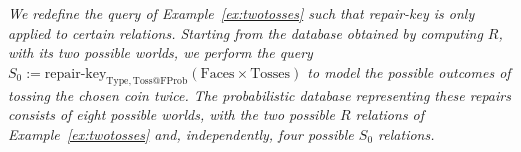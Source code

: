 \begin{example}\em
\label{ex:2}
%
We redefine the query of Example~\ref{ex:twotosses} such that
repair-key is only applied to certain relations.
Starting from the database obtained by computing $R$, with its two possible worlds, we perform the query
$
S_0 := \mbox{repair-key}_{\mathrm{Type,Toss@FProb}}
      (\mathrm{Faces} \times \mathrm{Tosses})
$
to model the possible outcomes of tossing the chosen coin twice.
%
The probabilistic database representing these repairs consists of
eight possible worlds, with the two possible $R$ relations of Example~\ref{ex:twotosses} and, independently, four possible $S_0$ relations.
%
\end{example}
